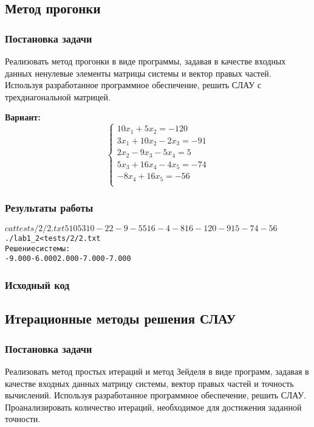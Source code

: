\subsection{Метод прогонки}

\subsubsection{Постановка задачи}
Реализовать метод прогонки в виде программы, задавая в качестве входных данных ненулевые элементы матрицы системы и вектор правых частей. Используя разработанное программное обеспечение, решить СЛАУ с трехдиагональной матрицей.

{\bfseries Вариант:}
\begin{equation*}
\begin{cases}
10x_1 + 5x_2 = -120\\
3x_1 + 10x_2 - 2x_3 = -91\\
2x_2 - 9x_3 - 5x_4 = 5\\
5x_3 + 16x_4 - 4x_5 = -74\\
-8x_4 + 16x_5 = -56\\
\end{cases}
\end{equation*}

\subsubsection{Результаты работы}
\begin{alltt}
$ cat tests/2/2.txt
5
10 5
3 10 -2
2 -9 -5
5 16 -4
-8 16
-120 -91 5 -74 -56

$ ./lab1_2 < tests/2/2.txt
Решение системы:
  -9.000   -6.000    2.000   -7.000   -7.000
\end{alltt}
\pagebreak

\subsubsection{Исходный код}

\pagebreak

\subsection{Итерационные методы решения СЛАУ}

\subsubsection{Постановка задачи}
Реализовать метод простых итераций и метод Зейделя в виде программ, задавая в качестве входных данных матрицу системы, вектор правых частей и точность вычислений. Используя разработанное программное обеспечение, решить СЛАУ. Проанализировать количество итераций, необходимое для достижения заданной точности.

